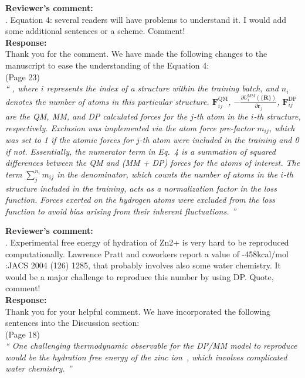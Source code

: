 \documentclass[doublespace,prb,aps,preprint]{revtex4}
\newcommand{\Quote}[1]{\textsl{``#1''}}
\newenvironment{Comment}{ {\bf \indent Reviewer's comment: \\} \setlength{\parindent}{1cm}  \sffamily }{ \ignorespacesafterend \\}
\newenvironment{Reply}{  {\bf Response: \\}  \setlength{\parindent}{1cm} \normalfont }{ \ignorespacesafterend \vspace{5mm}}
\newcommand{\HJ}[1]{\textcolor{red}{#1}}
\begin{document}
\begin{Comment}
6. Equation 4: several readers will have problems to understand it. 
I would add some additional sentences or a scheme.
Comment!
\end{Comment}
\begin{Reply}
    Thank you for the comment.
    We have made the following changes to the manuscript to ease the understanding of the Equation 4: \\
    \newline
    (Page 23) \\
    \Quote{
        , where $i$ represents the index of a structure within the training batch, and $n_i$ denotes the number of atoms in this particular structure. 
$\mathbf{F}^{\text{QM}}_{ij}$, $- \frac{\partial U_i^{\text{MM}}(\{ \mathbf{R}\})}{\partial \mathbf{r}_{j}}$, 
        $\mathbf{F}^{\text{DP}}_{ij}$ are the QM, MM, and DP calculated forces for the $j$-th atom in the $i$-th structure, respectively. 
        Exclusion was implemented via the atom force pre-factor $m_{ij}$, which was set to 1 if the atomic forces for $j$-th atom were included in the training and 0 if not. 
        Essentially, the numerator term in Eq.~4 is a summation of squared differences between the QM and (MM + DP) forces for the atoms of interest.
        The term $\sum^{n_i}_j m_{ij}$ in the denominator, which counts the number of atoms in the $i$-th structure included in the training, acts as a normalization factor in the loss function. 
Forces exerted on the hydrogen atoms were excluded from the loss function to avoid bias arising from their inherent fluctuations. 
    } 
\end{Reply}

\begin{Comment}
7. Experimental free energy of hydration of Zn2+ is very hard to be reproduced computationally.
Lawrence Pratt and coworkers report a value of -458kcal/mol :JACS 2004 (126) 1285, that probably involves also some water chemistry.
It would be a major challenge to reproduce this number by using DP.
Quote, comment!
\end{Comment}
\begin{Reply}
    Thank you for your helpful comment. We have incorporated the following sentences into the Discussion section: \\
    \newline
    (Page 18) \\
    \Quote{
 One challenging thermodynamic observable for the DP/MM model to reproduce would be the hydration free energy of the zinc ion~\cite{asthagiri2004hydration}, which involves complicated water chemistry. 
    } 
\end{Reply}
        
\end{document}

